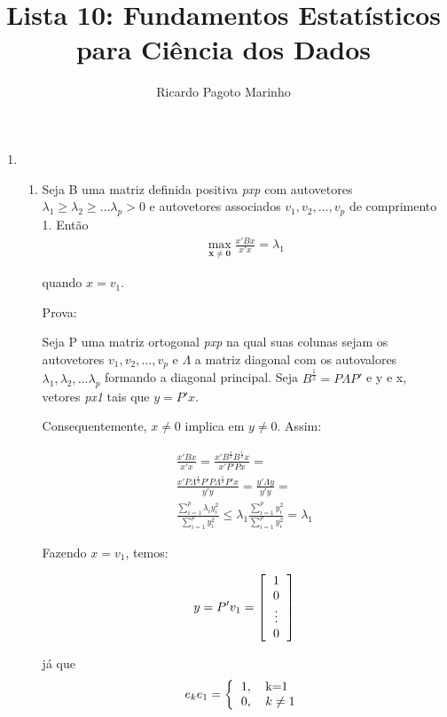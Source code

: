 \documentclass[11pt,a4paper]{book}
\title{Lista 10: Fundamentos Estatísticos para Ciência dos Dados}
\author{Ricardo Pagoto Marinho}
\DeclareMathOperator*{\maxi}{max}
\begin{document}
\maketitle
	\begin{enumerate}
		\item
		\begin{enumerate}[label=\alph*)]
			\item
			Seja B uma matriz definida positiva \textit{pxp} com autovetores $\lambda_1 \geq\lambda_2\geq \ldots\lambda_p > 0$ e autovetores associados $v_1, v_2,\ldots, v_p$ de comprimento 1.
			Então
			\begin{eqnarray*}
				\maxi_{\mathbf{x\neq 0}} \frac{x'Bx}{x'x}=\lambda_1
			\end{eqnarray*}
			
			quando $x=v_1$.
			
			Prova:
			
			Seja P uma matriz ortogonal \textit{pxp} na qual suas colunas sejam os autovetores $v_1, v_2,\ldots, v_p$ e $\Lambda$ a matriz diagonal com os autovalores $\lambda_1, \lambda_2, \ldots \lambda_p$ formando a diagonal principal.
			Seja $B^{\frac{1}{2}}=P\Lambda P'$ e y e x, vetores \textit{px1} tais que $y=P'x$.
			
			Consequentemente, $x\neq 0$ implica em $y\neq 0$.
			Assim:
			
			\begin{eqnarray*}
				\frac{x'Bx}{x'x}=\frac{x'B^{\frac{1}{2}}B^{\frac{1}{2}}x}{x'P'Px}=\\
				\frac{x'P\Lambda^{\frac{1}{2}} P' P\Lambda^{\frac{1}{2}}P'x}{y'y}=\frac{y'\Lambda y}{y'y}=\\
				\frac{\sum_{i=1}^{p}\lambda_i y_i^2}{\sum_{i=1}^{p}y_i^2}\leq \lambda_1\frac{\sum_{i=1}^{p}y_i^2}{\sum_{i=1}^{p}y_i^2}=\lambda_1
			\end{eqnarray*}
			
			Fazendo $x=v_1$, temos:
			
			\begin{eqnarray*}
				y=P'v_1=
				\left[\begin{tabular}{c}
				1\\
				0\\
				\vdots\\
				0
				\end{tabular}
				\right]
			\end{eqnarray*}
			
			já que
			\begin{eqnarray*}
				e_k e_1=\left\lbrace
				\begin{tabular}{c l}
				1, & k=1\\
				0, & $k\neq 1$
				\end{tabular}
				\right.
			\end{eqnarray*}
			

\end{enumerate}
\end{enumerate}
\end{document}
